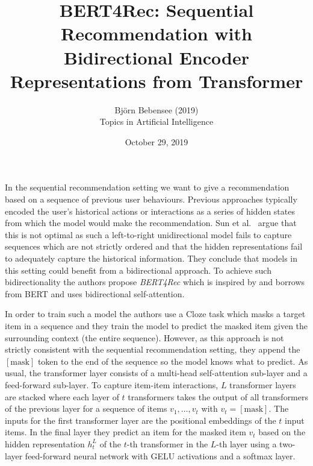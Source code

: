 \documentclass[12pt]{article}
\begin{document}
 
 
\title{BERT4Rec: Sequential Recommendation with Bidirectional Encoder Representations from Transformer}
\author{Bj\"orn Bebensee (2019)\\ %
Topics in Artificial Intelligence}
\date{October 29, 2019}
\maketitle

\noindent
In the sequential recommendation setting we want to give a recommendation based on a sequence of previous user behaviours. Previous approaches typically encoded the user's historical actions or interactions as a series of hidden states from which the model would make the recommendation. Sun et al.~\cite{sun} argue that this is not optimal as such a left-to-right unidirectional model fails to capture sequences which are not strictly ordered and that the hidden representations fail to adequately capture the historical information. They conclude that models in this setting could benefit from a bidirectional approach. To achieve such bidirectionality the authors propose \emph{BERT4Rec} which is inspired by and borrows from BERT and uses bidirectional self-attention.

In order to train such a model the authors use a Cloze task which masks a target item in a sequence and they train the model to predict the masked item given the surrounding context (the entire sequence). However, as this approach is not strictly consistent with the sequential recommendation setting, they append the $[\text{mask}]$ token to the end of the sequence so the model knows what to predict. As usual, the transformer layer consists of a multi-head self-attention sub-layer and a feed-forward sub-layer. To capture item-item interactions, $L$ transformer layers are stacked where each layer of $t$ transformers takes the output of all transformers of the previous layer for a sequence of items $v_1, \ldots, v_t$ with $v_t = [\text{mask}]$. The inputs for the first transformer layer are the positional embeddings of the $t$ input items.  In the final layer they predict an item for the masked item $v_t$ based on the hidden representation $h_t^L$ of the $t$-th transformer in the $L$-th layer using a two-layer feed-forward neural network with GELU activations and a softmax layer.
\end{document}
